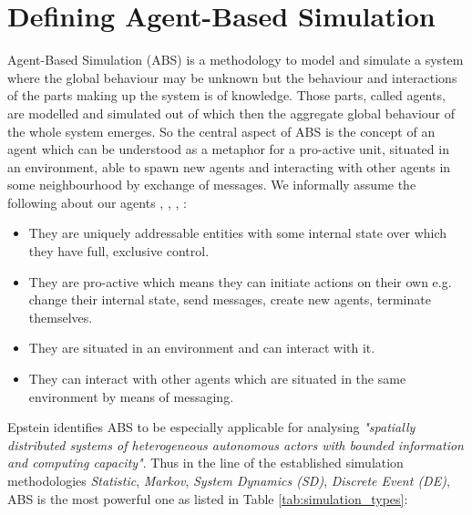 \section{Defining Agent-Based Simulation}
Agent-Based Simulation (ABS) is a methodology to model and simulate a system where the global behaviour may be unknown but the behaviour and interactions of the parts making up the system is of knowledge. Those parts, called agents, are modelled and simulated out of which then the aggregate global behaviour of the whole system emerges. So the central aspect of ABS is the concept of an agent which can be understood as a metaphor for a pro-active unit, situated in an environment, able to spawn new agents and interacting with other agents in some neighbourhood by exchange of messages. We informally assume the following about our agents \cite{siebers_introduction_2008}, \cite{wooldridge_introduction_2009}, \cite{siebers_discrete-event_2010}, \cite{dawson_opening_2014}:

\begin{itemize}
	\item They are uniquely addressable entities with some internal state over which they have full, exclusive control.
	\item They are pro-active which means they can initiate actions on their own e.g. change their internal state, send messages, create new agents, terminate themselves.
	\item They are situated in an environment and can interact with it.
	\item They can interact with other agents which are situated in the same environment by means of messaging.
\end{itemize} 

Epstein \cite{epstein_generative_2012} identifies ABS to be especially applicable for analysing \textit{"spatially distributed systems of heterogeneous autonomous actors with bounded information and computing capacity"}. Thus in the line of the established simulation methodologies \textit{Statistic}, \textit{Markov}, \textit{System Dynamics (SD)}, \textit{Discrete Event (DE)}, ABS is the most powerful one as listed in Table \ref{tab:simulation_types}:

